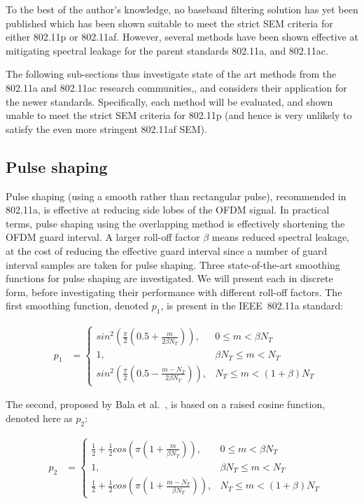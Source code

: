 To the best of the author's knowledge, no baseband filtering solution has yet been published which has been shown suitable to meet the strict SEM criteria for either 802.11p or 802.11af.
However, several methods have been shown effective at mitigating spectral leakage for the parent standards 802.11a, and 802.11ac.

The following sub-sections thus investigate state of the art methods from the 802.11a and 802.11ac research communities,, and considers their application for the newer standards.
Specifically, each method will be evaluated, and shown unable to meet the strict SEM criteria for 802.11p (and hence is very unlikely to satisfy the even more stringent 802.11af SEM). 

\subsection{Pulse shaping}
\label{subsec:Pulse}

Pulse shaping (using a smooth rather than rectangular pulse), recommended in 802.11a, is effective at reducing side lobes of the OFDM signal.
In practical terms, pulse shaping using the overlapping method is effectively shortening the OFDM guard interval.
A larger roll-off factor $\beta$ means reduced spectral leakage, at the cost of reducing the effective guard interval since a number of guard interval samples are taken for pulse shaping.
Three state-of-the-art smoothing functions for pulse shaping are investigated. We will present each in discrete form, before investigating their performance with different roll-off factors.
The first smoothing function, denoted $p_1$, is present in the IEEE~802.11a standard:

\begin{eqnarray}
\label{p1m}
&p_1 &=\begin{cases}	sin^2( \frac{\pi}{2}(0.5+\frac{m}{2\beta N_{T}}) ), 			& 0 \leq m < \beta N_{T} \\
					 	1, 															& \beta N_{T} \leq m < N_{T}  \\
					 	sin^2( \frac{\pi}{2}(0.5-\frac{m-N_{T}}{2\beta N_{T}}) ), 	& N_{T} \leq m < (1+\beta)N_{T} \end{cases}
\end{eqnarray}


The second, proposed by Bala et al.~\cite{Bala2013}, is based on a raised cosine function, denoted here as $p_2$:


\begin{eqnarray}
\label{p2m}
&p_2 &=\begin{cases}	\frac{1}{2}+\frac{1}{2}cos(\pi(1+\frac{m}{\beta N_{T}})), 			&0\leq m<\beta N_{T} \\
					 	1, 																	&\beta N_{T}\leq m < N_{T}  \\
					 	\frac{1}{2}+\frac{1}{2}cos(\pi(1+\frac{m-N_{T}}{\beta N_{T}})),		& N_{T}\leq m<(1+\beta)N_{T} \end{cases}
\end{eqnarray}


